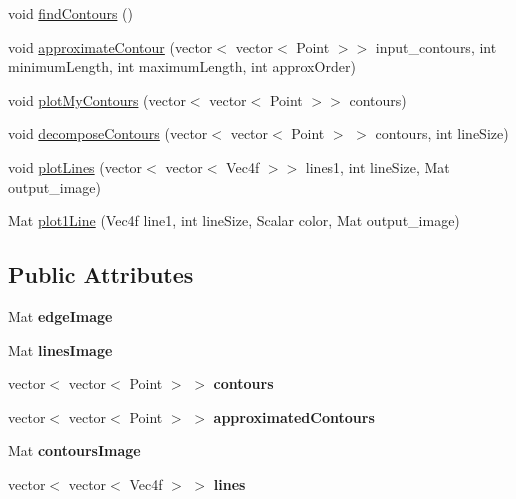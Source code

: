 \begin{DoxyCompactItemize}
\item 
void \hyperlink{classContoursAndLines_a0b5dd7edb7059cc7aa5a4296ffb4317c}{findContours} ()
\item 
void \hyperlink{classContoursAndLines_af2ae9375067d26c49dcd7fa52c85444a}{approximateContour} (vector$<$ vector$<$ Point $>$$>$ input\_\-contours, int minimumLength, int maximumLength, int approxOrder)
\item 
void \hyperlink{classContoursAndLines_aea09b8c601e2b9e24128fc506e4438dd}{plotMyContours} (vector$<$ vector$<$ Point $>$$>$ contours)
\item 
void \hyperlink{classContoursAndLines_a02a092093a9f66feb5714fede7b1be16}{decomposeContours} (vector$<$ vector$<$ Point $>$ $>$ contours, int lineSize)
\item 
void \hyperlink{classContoursAndLines_a8cec007cc0061798867936ebb400687a}{plotLines} (vector$<$ vector$<$ Vec4f $>$$>$ lines1, int lineSize, Mat output\_\-image)
\item 
Mat \hyperlink{classContoursAndLines_abb87059453ad6a0eaf22e98100606870}{plot1Line} (Vec4f line1, int lineSize, Scalar color, Mat output\_\-image)
\end{DoxyCompactItemize}
\subsection*{Public Attributes}
\begin{DoxyCompactItemize}
\item 
\hypertarget{classContoursAndLines_a0407956646772fbf4bf17fac631f1a28}{
Mat {\bfseries edgeImage}}
\label{classContoursAndLines_a0407956646772fbf4bf17fac631f1a28}

\item 
\hypertarget{classContoursAndLines_adf0046eb0ff3b4fb27ee30ce73471d53}{
Mat {\bfseries linesImage}}
\label{classContoursAndLines_adf0046eb0ff3b4fb27ee30ce73471d53}

\item 
\hypertarget{classContoursAndLines_aaa800d7a9f280fbfe086f3916650d039}{
vector$<$ vector$<$ Point $>$ $>$ {\bfseries contours}}
\label{classContoursAndLines_aaa800d7a9f280fbfe086f3916650d039}

\item 
\hypertarget{classContoursAndLines_a4abcbda23b9f8c411dbfedcbfdd38b2f}{
vector$<$ vector$<$ Point $>$ $>$ {\bfseries approximatedContours}}
\label{classContoursAndLines_a4abcbda23b9f8c411dbfedcbfdd38b2f}

\item 
\hypertarget{classContoursAndLines_a5a48086141ba799f5f495f78edafa3b1}{
Mat {\bfseries contoursImage}}
\label{classContoursAndLines_a5a48086141ba799f5f495f78edafa3b1}

\item 
\hypertarget{classContoursAndLines_a27b0e699b483619e46b908191acbccb9}{
vector$<$ vector$<$ Vec4f $>$ $>$ {\bfseries lines}}
\label{classContoursAndLines_a27b0e699b483619e46b908191acbccb9}

\end{DoxyCompactItemize}



